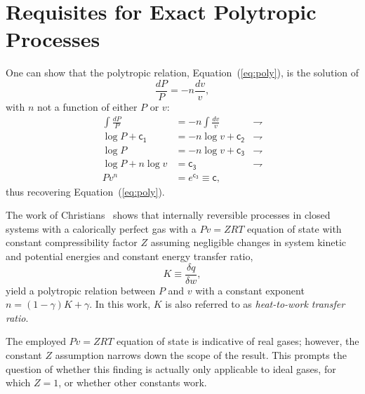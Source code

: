 \documentclass[fleqn,11pt]{SelfArx}
\begin{document}
\section{Requisites for Exact Polytropic Processes}\label{sec:requisites}

    One can show that the polytropic relation, Equation~(\ref{eq:poly}), is the solution of
    \begin{equation}
        \frac{dP}{P} = -n\frac{dv}{v},
        \label{eq:poly.ODE}
    \end{equation}
    \noindent with $n$ not a function of either $P$ or $v$:
    \begin{align}
        \int\frac{dP}{P} & = -n\int\frac{dv}{v} & \rightharpoondown
        \\
        \log P + \mathsf{c_1} & = -n\log v + \mathsf{c_2} & \rightharpoondown
        \\
        \log P & = -n\log v + \mathsf{c_3} & \rightharpoondown
        \\
        \log P + n\log v & = \mathsf{c_3} & \rightharpoondown
        \\
        Pv^n & = e^{\mathsf{c_3}} \equiv \mathsf{c},
    \end{align}
    \noindent thus recovering Equation~(\ref{eq:poly}).

    The  work  of  Christians~\cite{2012-ChristiansJ-IntJMechEngEduc}  shows   that   internally
    reversible processes in closed systems with a calorically perfect gas  with  a  $Pv  =  ZRT$
    equation of state with constant compressibility factor $Z$ assuming  negligible  changes  in
    system kinetic and potential energies and constant energy transfer ratio,
    \begin{equation}
        K \equiv \frac{\delta q}{\delta w},
        \label{eq:def.K}
    \end{equation}
    \noindent yield a polytropic relation between $P$ and $v$ with a constant exponent $n = (1 -
    \gamma)K + \gamma$. In this work, $K$ is also referred  to  as  \emph{heat-to-work  transfer
    ratio}.

    The employed $Pv = ZRT$ equation of state is indicative of real gases; however, the constant
    $Z$ assumption narrows down the scope of the result. This prompts the  question  of  whether
    this finding is actually only applicable to ideal gases, for which $Z=1$, or  whether  other
    constants work.
\end{document}
